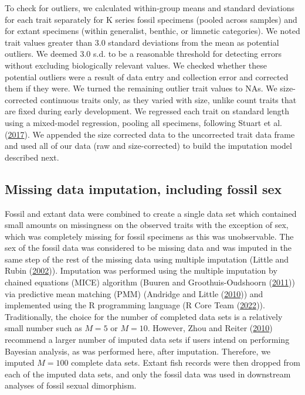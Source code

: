 \documentclass[
  12pt,
]{article}
\begin{document}
To check for outliers, we calculated within-group means and standard
deviations for each trait separately for K series fossil specimens
(pooled across samples) and for extant specimens (within generalist,
benthic, or limnetic categories). We noted trait values greater than 3.0
standard deviations from the mean as potential outliers. We deemed 3.0
s.d. to be a reasonable threshold for detecting errors without excluding
biologically relevant values. We checked whether these potential
outliers were a result of data entry and collection error and corrected
them if they were. We turned the remaining outlier trait values to NAs.
We size-corrected continuous traits only, as they varied with size,
unlike count traits that are fixed during early development. We
regressed each trait on standard length using a mixed-model regression,
pooling all specimens, following Stuart et al.
(\protect\hyperlink{ref-Stuartetal2017}{2017}). We appended the size
corrected data to the uncorrected trait data frame and used all of our
data (raw and size-corrected) to build the imputation model described
next.

\hypertarget{missing-data-imputation-including-fossil-sex}{%
\subsection{Missing data imputation, including fossil
sex}\label{missing-data-imputation-including-fossil-sex}}

Fossil and extant data were combined to create a single data set which
contained small amounts on missingness on the observed traits with the
exception of sex, which was completely missing for fossil specimens as
this was unobservable. The sex of the fossil data was considered to be
missing data and was imputed in the same step of the rest of the missing
data using multiple imputation (Little and Rubin
(\protect\hyperlink{ref-little2002statistical}{2002})). Imputation was
performed using the multiple imputation by chained equations (MICE)
algorithm (Buuren and Groothuis-Oudshoorn
(\protect\hyperlink{ref-MICE}{2011})) via predictive mean matching (PMM)
(Andridge and Little (\protect\hyperlink{ref-hotdeck}{2010})) and
implemented using the R programming language (R Core Team
(\protect\hyperlink{ref-R2022language}{2022})). Traditionally, the
choice for the number of completed data sets is a relatively small
number such as \(M = 5\) or \(M = 10\). However, Zhou and Reiter
(\protect\hyperlink{ref-ZhouReiter2010}{2010}) recommend a larger number
of imputed data sets if users intend on performing Bayesian analysis, as
was performed here, after imputation. Therefore, we imputed \(M = 100\)
complete data sets. Extant fish records were then dropped from each of
the imputed data sets, and only the fossil data was used in downstream
analyses of fossil sexual dimorphism.
\end{document}
